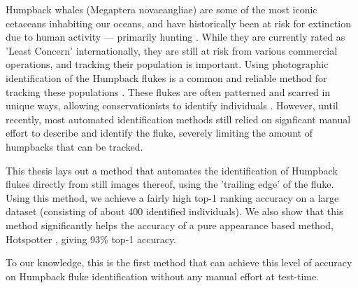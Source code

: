 

Humpback whales (Megaptera novaeangliae) are some of the most iconic cetaceans inhabiting our oceans, and have historically been at risk for extinction due to human activity --- primarily hunting \cite{breiwick1983simulated}. 
While they are currently rated as 'Least Concern' \cite{reilly2008megaptera} internationally, they are still at risk from various commercial operations, and tracking their population is important. 
Using photographic identification of the Humpback flukes is a common and reliable method for tracking these populations \cite{blackmer2000temporal}.
These flukes are often patterned and scarred in unique ways, allowing conservationists to identify individuals \cite{katona1990population}.
However, until recently, most automated identification methods still relied on signficant manual effort to describe and identify the fluke, severely limiting the amount of humpbacks that can be tracked.

This thesis lays out a method that automates the identification of Humpback flukes directly from still images thereof, using the 'trailing edge' of the fluke.
Using this method, we achieve a fairly high top-1 ranking accuracy on a large dataset (consisting of about 400 identified individuals).
We also show that this method significantly helps the accuracy of a pure appearance based method, Hotspotter \cite{crall_hotspotter_2013}, giving 93\% top-1 accuracy.

To our knowledge, this is the first method that can achieve this level of accuracy on Humpback fluke identification without any manual effort at test-time.



